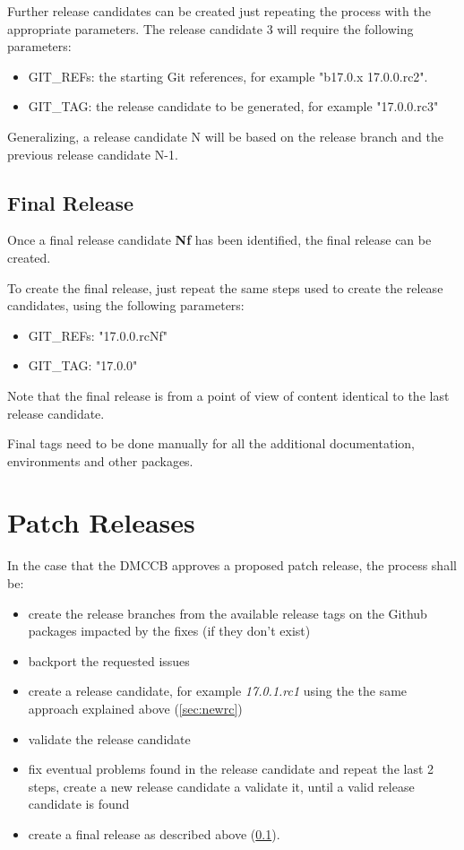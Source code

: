 Further release candidates can be created just repeating the process with the appropriate parameters.
The release candidate 3 will require the following parameters:

\begin{itemize}
\item GIT\_REFs: the starting Git references, for example "b17.0.x 17.0.0.rc2". 
\item GIT\_TAG: the release candidate to be generated, for example "17.0.0.rc3"
\end{itemize}

Generalizing, a release candidate N will be based on the release branch and the previous release candidate N-1.


\subsection{Final Release} \label{sec:finalrelease}

Once a final release candidate \textbf{Nf} has been identified, the final release can be created.

To create the final release, just repeat the same steps used to create the release candidates, using the following parameters:

\begin{itemize}
\item GIT\_REFs: "17.0.0.rcNf"
\item GIT\_TAG: "17.0.0"
\end{itemize}

Note that the final release is from a point of view of content identical to the last release candidate.

Final tags need to be done manually for all the additional documentation, environments and other packages.

\newpage

\section{Patch Releases} \label{sec:patchreleases}

In the case that the DMCCB approves a proposed patch release, the process shall be:

\begin{itemize}
\item create the release branches from the available release tags on the Github packages impacted by the fixes (if they don't exist)
\item backport the requested issues
\item create a release candidate, for example \textit{17.0.1.rc1} using the the same approach explained above (\ref{sec:newrc})
\item validate the release candidate
\item fix eventual problems found in the release candidate and repeat the last 2 steps, create a new release candidate a validate it, until a valid release candidate is found
\item create a final release as described above (\ref{sec:finalrelease}).
\end{itemize}


